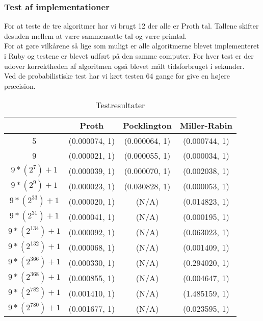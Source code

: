 \documentclass[12pt]{article}
\begin{document}
\subsubsection*{Test af implementationer}
For at teste de tre algoritmer har vi brugt 12 der alle er Proth tal. Tallene skifter desuden mellem at være sammensatte tal og være primtal. \\
For at gøre vilkårene så lige som muligt er alle algoritmerne blevet implementeret i Ruby og testene er blevet udført på den samme computer. 
For hver test er der udover korrektheden af algoritmen også blevet målt tidsforbruget i sekunder.\\
Ved de probabilistiske test har vi kørt testen 64 gange for give en højere præcision.\\ 
\begin{table}
\begin{center}
\begin{tabular}{c | c | c | c  }
\hline 
     & Proth & Pocklington & Miller-Rabin \\ \hline
   5 & (0.000074, 1) & (0.000064, 1) & (0.000744, 1) \\ \hline
   9 & (0.000021, 1) & (0.000055, 1) & (0.000034, 1) \\ \hline
   $9*(2^7)+1$ & (0.000039, 1) & (0.000070, 1) & (0.002038, 1) \\ \hline
   $9*(2^9)+1$ & (0.000023, 1) & (0.030828, 1) & (0.000053, 1) \\ \hline
   $9*(2^{33})+1$ & (0.000020, 1) & (N/A) & (0.014823, 1) \\ \hline
   $9*(2^{31})+1$ & (0.000041, 1) & (N/A) & (0.000195, 1) \\ \hline
   $9*(2^{134})+1$ & (0.000092, 1) & (N/A) & (0.063023, 1) \\ \hline
   $9*(2^{132})+1$ & (0.000068, 1) & (N/A) & (0.001409, 1) \\ \hline
   $9*(2^{366})+1$ & (0.000330, 1) & (N/A) & (0.294020, 1) \\ \hline
   $9*(2^{368})+1$ & (0.000855, 1) & (N/A) & (0.004647, 1) \\ \hline
   $9*(2^{782})+1$ & (0.001410, 1) & (N/A) & (1.485159, 1) \\ \hline
   $9*(2^{780})+1$ & (0.001677, 1) & (N/A) & (0.023595, 1)\\ \hline
\end{tabular}
\end{center}
\caption{Testresultater}
\end{table}
\end{document}
